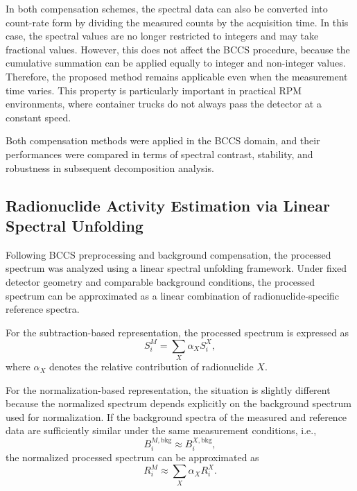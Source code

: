 \documentclass[fleqn, 10pt]{wlscirep}
\begin{document}
In both compensation schemes, the spectral data can also be converted into count-rate form by dividing the measured counts by the acquisition time. In this case, the spectral values are no longer restricted to integers and may take fractional values. However, this does not affect the BCCS procedure, because the cumulative summation can be applied equally to integer and non-integer values. Therefore, the proposed method remains applicable even when the measurement time varies. This property is particularly important in practical RPM environments, where container trucks do not always pass the detector at a constant speed.

Both compensation methods were applied in the BCCS domain, and their performances were compared in terms of spectral contrast, stability, and robustness in subsequent decomposition analysis.

\subsection*{Radionuclide Activity Estimation via Linear Spectral Unfolding}

Following BCCS preprocessing and background compensation, the processed spectrum was analyzed using a linear spectral unfolding framework. Under fixed detector geometry and comparable background conditions, the processed spectrum can be approximated as a linear combination of radionuclide-specific reference spectra.

For the subtraction-based representation, the processed spectrum is expressed as
\begin{equation}
S_i^{M} = \sum_{X} \alpha_X S_i^{X},
\label{eqn:subtraction_unfolding}
\end{equation}
where $\alpha_X$ denotes the relative contribution of radionuclide $X$.

For the normalization-based representation, the situation is slightly different because the normalized spectrum depends explicitly on the background spectrum used for normalization. If the background spectra of the measured and reference data are sufficiently similar under the same measurement conditions, i.e.,
\begin{equation}
B_i^{M,\mathrm{bkg}} \approx B_i^{X,\mathrm{bkg}},
\label{eqn:bkg_similarity}
\end{equation}
the normalized processed spectrum can be approximated as
\begin{equation}
R_i^{M} \approx \sum_{X} \alpha_X R_i^{X}.
\label{eqn:ratio_unfolding}
\end{equation}
\end{document}

